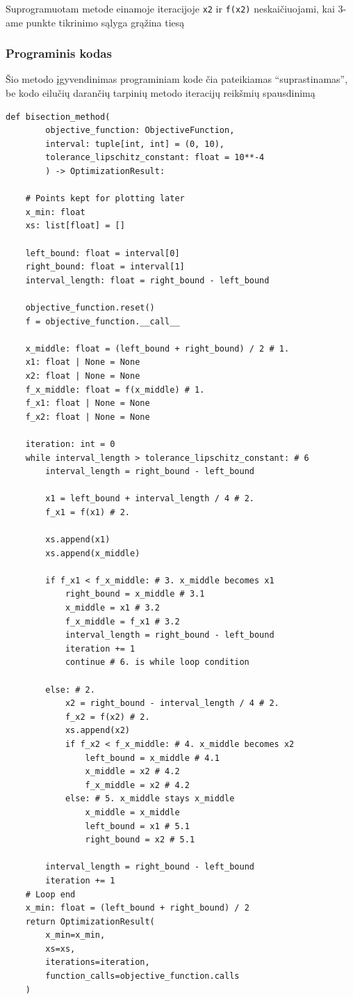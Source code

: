 \documentclass[lithuanian,a4paper,12pt]{article}
\newcommand{\mil}{\texttt}
\begin{document}
Suprogramuotam metode einamoje iteracijoje \mil{x2} ir \mil{f(x2)} neskaičiuojami, kai 3-ame punkte tikrinimo sąlyga grąžina tiesą

\pagebreak
\subsubsection*{Programinis kodas}
Šio metodo įgyvendinimas programiniam kode čia pateikiamas ``suprastinamas'', be kodo eilučių darančių tarpinių metodo iteracijų reikšmių spausdinimą

\begin{verbatim}
def bisection_method(
        objective_function: ObjectiveFunction, 
        interval: tuple[int, int] = (0, 10), 
        tolerance_lipschitz_constant: float = 10**-4
        ) -> OptimizationResult:
    
    # Points kept for plotting later
    x_min: float
    xs: list[float] = []
    
    left_bound: float = interval[0]
    right_bound: float = interval[1]
    interval_length: float = right_bound - left_bound

    objective_function.reset()
    f = objective_function.__call__

    x_middle: float = (left_bound + right_bound) / 2 # 1.
    x1: float | None = None
    x2: float | None = None
    f_x_middle: float = f(x_middle) # 1.
    f_x1: float | None = None
    f_x2: float | None = None

    iteration: int = 0
    while interval_length > tolerance_lipschitz_constant: # 6
        interval_length = right_bound - left_bound
            
        x1 = left_bound + interval_length / 4 # 2.
        f_x1 = f(x1) # 2.

        xs.append(x1)
        xs.append(x_middle)
        
        if f_x1 < f_x_middle: # 3. x_middle becomes x1
            right_bound = x_middle # 3.1
            x_middle = x1 # 3.2
            f_x_middle = f_x1 # 3.2
            interval_length = right_bound - left_bound
            iteration += 1
            continue # 6. is while loop condition

        else: # 2.
            x2 = right_bound - interval_length / 4 # 2.
            f_x2 = f(x2) # 2.
            xs.append(x2)
            if f_x2 < f_x_middle: # 4. x_middle becomes x2
                left_bound = x_middle # 4.1 
                x_middle = x2 # 4.2 
                f_x_middle = x2 # 4.2
            else: # 5. x_middle stays x_middle
                x_middle = x_middle
                left_bound = x1 # 5.1 
                right_bound = x2 # 5.1

        interval_length = right_bound - left_bound
        iteration += 1
    # Loop end
    x_min: float = (left_bound + right_bound) / 2
    return OptimizationResult(
        x_min=x_min, 
        xs=xs, 
        iterations=iteration, 
        function_calls=objective_function.calls
    )
\end{verbatim}
\end{document}
